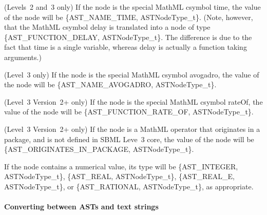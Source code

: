 \begin{DoxyItemize}
\item (Levels~2 and~3 only) If the node is the special Math\+ML csymbol {\ttfamily time}, the value of the node will be \{A\+S\+T\+\_\+\+N\+A\+M\+E\+\_\+\+T\+I\+ME, A\+S\+T\+Node\+Type\+\_\+t\}. (Note, however, that the Math\+ML csymbol {\ttfamily delay} is translated into a node of type \{A\+S\+T\+\_\+\+F\+U\+N\+C\+T\+I\+O\+N\+\_\+\+D\+E\+L\+AY, A\+S\+T\+Node\+Type\+\_\+t\}. The difference is due to the fact that {\ttfamily time} is a single variable, whereas {\ttfamily delay} is actually a function taking arguments.)\end{DoxyItemize}
\begin{DoxyItemize}
\item (Level~3 only) If the node is the special Math\+ML csymbol {\ttfamily avogadro}, the value of the node will be \{A\+S\+T\+\_\+\+N\+A\+M\+E\+\_\+\+A\+V\+O\+G\+A\+D\+RO, A\+S\+T\+Node\+Type\+\_\+t\}.\end{DoxyItemize}
\begin{DoxyItemize}
\item (Level~3 Version~2+ only) If the node is the special Math\+ML csymbol {\ttfamily rate\+Of}, the value of the node will be \{A\+S\+T\+\_\+\+F\+U\+N\+C\+T\+I\+O\+N\+\_\+\+R\+A\+T\+E\+\_\+\+OF, A\+S\+T\+Node\+Type\+\_\+t\}.\end{DoxyItemize}
\begin{DoxyItemize}
\item (Level~3 Version~2+ only) If the node is a Math\+ML operator that originates in a package, and is not defined in S\+B\+ML Leve~3 core, the value of the node will be \{A\+S\+T\+\_\+\+O\+R\+I\+G\+I\+N\+A\+T\+E\+S\+\_\+\+I\+N\+\_\+\+P\+A\+C\+K\+A\+GE, A\+S\+T\+Node\+Type\+\_\+t\}.\end{DoxyItemize}
\begin{DoxyItemize}
\item If the node contains a numerical value, its type will be \{A\+S\+T\+\_\+\+I\+N\+T\+E\+G\+ER, A\+S\+T\+Node\+Type\+\_\+t\}, \{A\+S\+T\+\_\+\+R\+E\+AL, A\+S\+T\+Node\+Type\+\_\+t\}, \{A\+S\+T\+\_\+\+R\+E\+A\+L\+\_\+E, A\+S\+T\+Node\+Type\+\_\+t\}, or \{A\+S\+T\+\_\+\+R\+A\+T\+I\+O\+N\+AL, A\+S\+T\+Node\+Type\+\_\+t\}, as appropriate.\end{DoxyItemize}
\paragraph*{\label{_math-convert}%
Converting between A\+S\+Ts and text strings}

